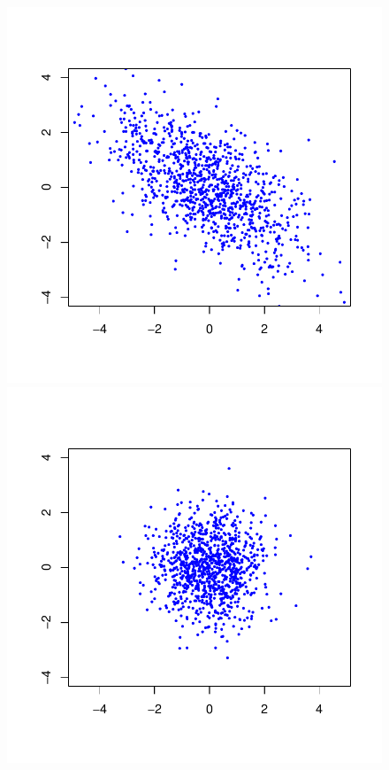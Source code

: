 \documentclass{article}
\begin{document}
\newcommand{\sscale}{0.5}
\begin{figure}
	\centering
	\includegraphics[scale=\sscale]{scatter1}
	\includegraphics[scale=\sscale]{scatter2}


\end{figure}
\end{document}
